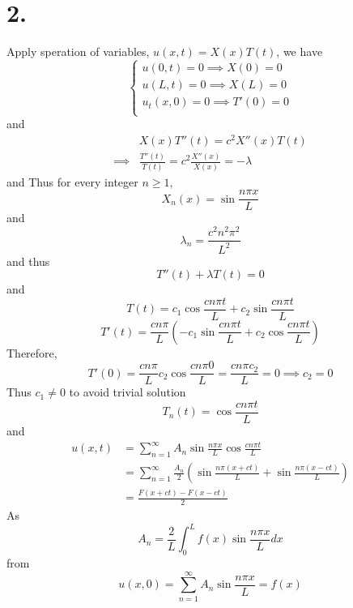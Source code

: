 \documentclass[11pt]{article}
\theoremstyle{mystyle}
\theoremstyle{definition}
\begin{document}
\section*{2.}
Apply speration of variables, $u(x,t) = X(x) T(t)$, we have  \\
\[
  \begin{cases}
    u(0,t) = 0 \implies X(0) = 0 \\
    u(L,t) = 0 \implies X(L) = 0 \\
    u_t(x,0) = 0 \implies T'(0) = 0 \\
  \end{cases}
\]
and 
\begin{align*}
  &X(x) T''(t) = c^2 X''(x)T(t) \\
  \implies & \displaystyle\frac{T''(t)}{T(t)} = c^2 \displaystyle\frac{X''(x)}{X(x)} = -\lambda
\end{align*}
and
Thus for every integer $n\ge 1$,  
\[
  X_n(x) = \sin \displaystyle\frac{n\pi x}{L}
\]
and 
\[
  \lambda_n =  \displaystyle\frac{c^2 n^2\pi^2}{L^2}
\]
and thus 
\[
  T''(t) + \lambda T(t) = 0 
\]
and 
\[
  T(t) = c_1 \cos \displaystyle\frac{cn\pi t}{L} + c_2 \sin \displaystyle\frac{cn \pi t}{L}
\]
\[
  T'(t) = \displaystyle\frac{cn\pi}{L} \left( - c_1 \sin \displaystyle\frac{cn\pi t}{L} + c_2 \cos \displaystyle\frac{cn \pi t}{L} \right)
\]
Therefore, 
\[
  T'(0) = \displaystyle\frac{cn\pi }{L} c_2 \cos \displaystyle\frac{cn\pi 0}{L} = \displaystyle\frac{cn \pi c_2}{L} = 0 \implies c_2 = 0
\]
Thus $c_1 \ne 0$ to avoid trivial solution
\[
  T_n(t) = \cos \displaystyle\frac{cn\pi t}{L} 
\]
and 
\begin{align*}
  u(x,t) &= \sum_{n=1}^\infty A_n \sin \displaystyle\frac{n\pi x}{L} \cos \displaystyle\frac{cn\pi t}{L} \\
  &= \sum_{n=1}^\infty \displaystyle\frac{A_n}{2} \left(\sin \displaystyle\frac{n\pi(x+ct)}{L} + \sin \displaystyle\frac{n\pi(x-ct)}{L} \right) \\
  &= \displaystyle\frac{F(x+ct) - F(x-ct)}{2} 
\end{align*}
As 
\[
  A_n = \displaystyle\frac{2}{L} \int_0^L f(x) \sin \displaystyle\frac{n\pi x}{L} dx 
\]
from 
\[
  u(x,0) = \sum_{n=1}^\infty A_n \sin \displaystyle\frac{n\pi x}{L} = f(x)
\]
\newpage
\end{document}
